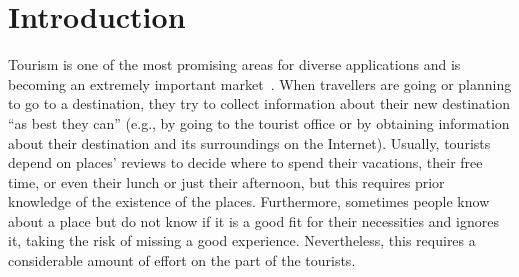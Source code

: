 \section{Introduction}



Tourism is one of the most promising areas for diverse applications and is becoming an extremely
important market~\cite{buhalis2011tourism,murphy2013tourism,fermoso2015open,ku2015cultivating,alghamdi2016tourism,artemenko2017tourism,kazandzhieva2019tourism}. 
When travellers are going or planning to go to a destination, they try to collect information about their new destination “as best they can” (e.g., by going to the tourist office or by obtaining information about their destination and its surroundings on the Internet). Usually, tourists depend on places' reviews to decide where to spend their vacations, their free time, or even their lunch or just their afternoon, but this requires prior knowledge of the existence of the places. Furthermore, sometimes people know about a place but do not know if it is a good fit for their necessities and ignores it, taking the risk of missing a good experience. Nevertheless, this requires a considerable amount of effort on the part of the tourists.

